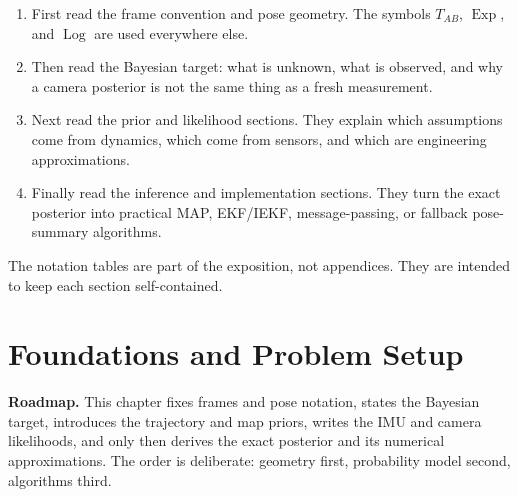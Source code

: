 \documentclass[11pt]{report}
\newcommand{\Exp}{\operatorname{Exp}}
\newcommand{\Log}{\operatorname{Log}}
\newcommand{\ChapterRoadmap}[1]{%
\begin{center}
\begin{minipage}{0.94\textwidth}
\small\textbf{Roadmap.} #1
\end{minipage}
\end{center}
\vspace{1mm}}
\begin{document}
\begin{enumerate}
  \item First read the frame convention and pose geometry. The symbols $T_{AB}$, $\Exp$, and $\Log$ are used everywhere else.
  \item Then read the Bayesian target: what is unknown, what is observed, and why a camera posterior is not the same thing as a fresh measurement.
  \item Next read the prior and likelihood sections. They explain which assumptions come from dynamics, which come from sensors, and which are engineering approximations.
  \item Finally read the inference and implementation sections. They turn the exact posterior into practical MAP, EKF/IEKF, message-passing, or fallback pose-summary algorithms.
\end{enumerate}

The notation tables are part of the exposition, not appendices. They are intended to keep each section self-contained.

\clearpage

\chapter{Foundations and Problem Setup}
\ChapterRoadmap{This chapter fixes frames and pose notation, states the Bayesian target, introduces the trajectory and map priors, writes the IMU and camera likelihoods, and only then derives the exact posterior and its numerical approximations. The order is deliberate: geometry first, probability model second, algorithms third.}
\end{document}
